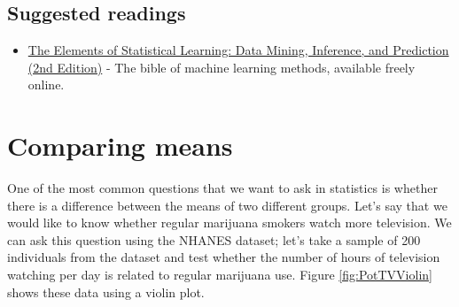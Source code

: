 \documentclass[]{book}
\newenvironment{Shaded}{\begin{snugshade}}{\end{snugshade}}
\newcommand{\KeywordTok}[1]{\textcolor[rgb]{0.13,0.29,0.53}{\textbf{#1}}}
\newcommand{\DataTypeTok}[1]{\textcolor[rgb]{0.13,0.29,0.53}{#1}}
\newcommand{\DecValTok}[1]{\textcolor[rgb]{0.00,0.00,0.81}{#1}}
\newcommand{\FloatTok}[1]{\textcolor[rgb]{0.00,0.00,0.81}{#1}}
\newcommand{\StringTok}[1]{\textcolor[rgb]{0.31,0.60,0.02}{#1}}
\newcommand{\CommentTok}[1]{\textcolor[rgb]{0.56,0.35,0.01}{\textit{#1}}}
\newcommand{\OperatorTok}[1]{\textcolor[rgb]{0.81,0.36,0.00}{\textbf{#1}}}
\newcommand{\NormalTok}[1]{#1}
\providecommand{\tightlist}{%
  \setlength{\itemsep}{0pt}\setlength{\parskip}{0pt}}
\theoremstyle{definition}
\theoremstyle{definition}
\theoremstyle{definition}
\theoremstyle{remark}
\begin{document}
\section{Suggested readings}\label{suggested-readings-10}

\begin{itemize}
\tightlist
\item
  \href{https://web.stanford.edu/~hastie/Papers/ESLII.pdf}{The Elements
  of Statistical Learning: Data Mining, Inference, and Prediction (2nd
  Edition)} - The bible of machine learning methods, available freely
  online.
\end{itemize}

\chapter{Comparing means}\label{comparing-means}

One of the most common questions that we want to ask in statistics is
whether there is a difference between the means of two different groups.
Let's say that we would like to know whether regular marijuana smokers
watch more television. We can ask this question using the NHANES
dataset; let's take a sample of 200 individuals from the dataset and
test whether the number of hours of television watching per day is
related to regular marijuana use. Figure \ref{fig:PotTVViolin} shows
these data using a violin plot.

\begin{Shaded}
\end{Shaded}
\end{document}
